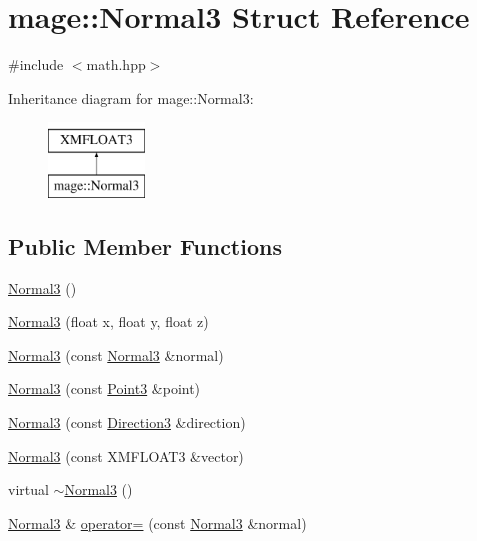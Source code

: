 \hypertarget{structmage_1_1_normal3}{}\section{mage\+:\+:Normal3 Struct Reference}
\label{structmage_1_1_normal3}


{\ttfamily \#include $<$math.\+hpp$>$}

Inheritance diagram for mage\+:\+:Normal3\+:\begin{figure}[H]
\begin{center}
\leavevmode
\includegraphics[height=2.000000cm]{structmage_1_1_normal3}
\end{center}
\end{figure}
\subsection*{Public Member Functions}
\begin{DoxyCompactItemize}
\item 
\hyperlink{structmage_1_1_normal3_a66ec99f0de4f8231f747e37a4da65cc4}{Normal3} ()
\item 
\hyperlink{structmage_1_1_normal3_a59094c1f96a9721cd8846c5c6ec06f93}{Normal3} (float x, float y, float z)
\item 
\hyperlink{structmage_1_1_normal3_ada9c762e16b51177f3fc1aa6d5310b20}{Normal3} (const \hyperlink{structmage_1_1_normal3}{Normal3} \&normal)
\item 
\hyperlink{structmage_1_1_normal3_a1a58b2fcb3920ff68007257ae6434273}{Normal3} (const \hyperlink{structmage_1_1_point3}{Point3} \&point)
\item 
\hyperlink{structmage_1_1_normal3_a0942e7aace8354f0a414f77ccf90b69c}{Normal3} (const \hyperlink{structmage_1_1_direction3}{Direction3} \&direction)
\item 
\hyperlink{structmage_1_1_normal3_a61565f1183535666a2fb5183b83bebd2}{Normal3} (const X\+M\+F\+L\+O\+A\+T3 \&vector)
\item 
virtual \hyperlink{structmage_1_1_normal3_ae5ea8901723ca2dfe8d692e7269935f9}{$\sim$\+Normal3} ()
\item 
\hyperlink{structmage_1_1_normal3}{Normal3} \& \hyperlink{structmage_1_1_normal3_ade86357989ceaecf1b22bb9e53ca7fed}{operator=} (const \hyperlink{structmage_1_1_normal3}{Normal3} \&normal)
\end{DoxyCompactItemize}


